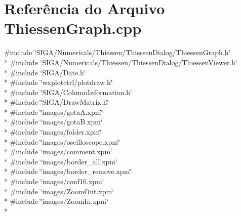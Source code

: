 \section{Referência do Arquivo Thiessen\+Graph.\+cpp}
\label{_thiessen_graph_8cpp}
{\ttfamily \#include \char`\"{}S\+I\+G\+A/\+Numericals/\+Thiessen/\+Thiessen\+Dialog/\+Thiessen\+Graph.\+h\char`\"{}}\\*
{\ttfamily \#include \char`\"{}S\+I\+G\+A/\+Numericals/\+Thiessen/\+Thiessen\+Dialog/\+Thiessen\+Viewer.\+h\char`\"{}}\\*
{\ttfamily \#include \char`\"{}S\+I\+G\+A/\+Date.\+h\char`\"{}}\\*
{\ttfamily \#include \char`\"{}wxplotctrl/plotdraw.\+h\char`\"{}}\\*
{\ttfamily \#include \char`\"{}S\+I\+G\+A/\+Column\+Information.\+h\char`\"{}}\\*
{\ttfamily \#include \char`\"{}S\+I\+G\+A/\+Draw\+Matrix.\+h\char`\"{}}\\*
{\ttfamily \#include \char`\"{}images/gota\+A.\+xpm\char`\"{}}\\*
{\ttfamily \#include \char`\"{}images/gota\+B.\+xpm\char`\"{}}\\*
{\ttfamily \#include \char`\"{}images/folder.\+xpm\char`\"{}}\\*
{\ttfamily \#include \char`\"{}images/oscilloscope.\+xpm\char`\"{}}\\*
{\ttfamily \#include \char`\"{}images/comment.\+xpm\char`\"{}}\\*
{\ttfamily \#include \char`\"{}images/border\+\_\+all.\+xpm\char`\"{}}\\*
{\ttfamily \#include \char`\"{}images/border\+\_\+remove.\+xpm\char`\"{}}\\*
{\ttfamily \#include \char`\"{}images/conf16.\+xpm\char`\"{}}\\*
{\ttfamily \#include \char`\"{}images/\+Zoom\+Out.\+xpm\char`\"{}}\\*
{\ttfamily \#include \char`\"{}images/\+Zoom\+In.\+xpm\char`\"{}}\\*

